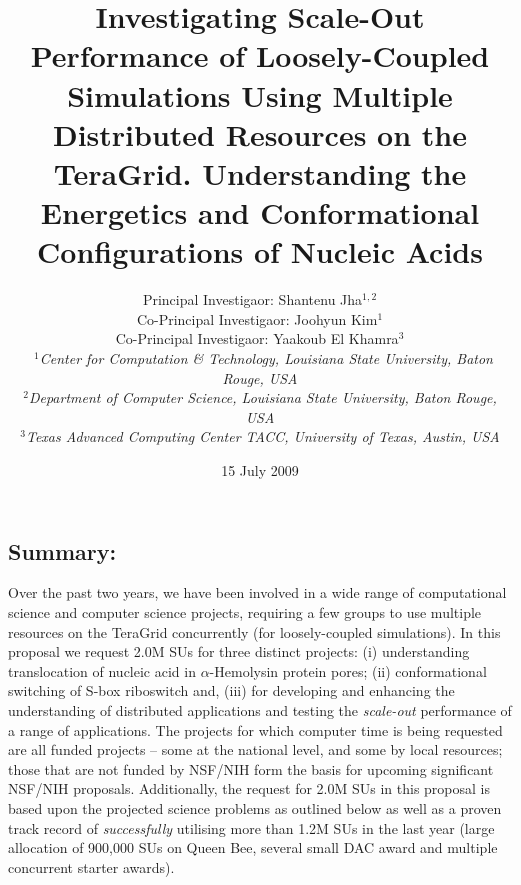 \documentclass[a4paper,10pt]{article}
\begin{document}
\title{\large Investigating Scale-Out Performance of 
Loosely-Coupled Simulations Using Multiple Distributed Resources on the TeraGrid. Understanding the Energetics and Conformational Configurations of Nucleic Acids}

\author{Principal Investigaor: Shantenu Jha$^{1,2}$ \\ Co-Principal Investigaor: Joohyun Kim$^{1}$ \\ Co-Principal Investigaor: Yaakoub El Khamra$^{3}$\\\
   \small{\emph{$^{1}$Center for Computation \& Technology, Louisiana State University, Baton Rouge, 
USA}}
\\
  \small{\emph{$^{2}$Department of Computer Science, Louisiana State
      University, Baton Rouge, USA}}
\\
  \small{\emph{$^{3}$Texas Advanced Computing Center TACC, University of Texas, Austin, USA}}}

\newif\ifdraft
\drafttrue
\ifdraft
\newcommand{\amnote}[1]{ {\textcolor{magenta} { ***AM: #1c }}}
\newcommand{\jhanote}[1]{ {\textcolor{red} { ***SJ: #1 }}}
\newcommand{\michaelnote}[1]{ {\textcolor{blue} { ***MM: #1 }}}
\else
\newcommand{\amnote}[1]{}
\newcommand{\jhanote}[1]{}
\newcommand{\michaelnote}[1]{ {\textcolor{blue} { ***MM: #1 }}}
\fi


\date{15 July 2009}

\maketitle

\subsection*{Summary:} Over the past two years, we have been involved in a wide range of computational science and computer science projects, requiring a few groups to use multiple resources on the TeraGrid concurrently (for loosely-coupled simulations). In this proposal we request 2.0M SUs for three distinct projects: (i) understanding translocation of nucleic acid in $\alpha$-Hemolysin protein pores; (ii) conformational switching of S-box riboswitch and, (iii) for developing and enhancing the understanding of distributed applications and testing the {\it scale-out } performance of a range of applications. The projects for which computer time is being requested are all funded projects -- some at the national level, and some by local resources; those that are not funded by NSF/NIH form the basis for upcoming significant NSF/NIH proposals.  Additionally, the request for 2.0M SUs in this proposal is based upon the projected science problems as outlined below as well as a proven track record of {\it successfully} utilising more than 1.2M SUs in the last year (large allocation of 900,000 SUs on Queen Bee, several small DAC award and multiple concurrent starter awards).
\end{document}
